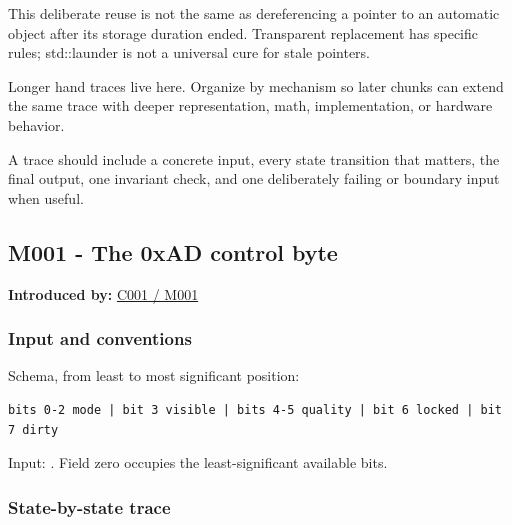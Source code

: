 This deliberate reuse is not the same as dereferencing a pointer to an automatic object after its storage duration ended. Transparent replacement has specific rules; std::launder is not a universal cure for stale pointers.

Longer hand traces live here. Organize by mechanism so later chunks can extend the same trace with deeper representation, math, implementation, or hardware behavior.

A trace should include a concrete input, every state transition that matters, the final output, one invariant check, and one deliberately failing or boundary input when useful.

\subsection{M001 - The 0xAD control byte}\label{appendix-92ff77d4dfdc-m001---the-0xad-control-byte}

\hypertarget{appendix-92ff77d4dfdc-m001---the-0xad-control-byte}{}

\textbf{Introduced by:} \hyperref[01-foundations-i-ch001-from-a-signal-to-an-interpretation]{C001 / M001}

\subsubsection{Input and conventions}\label{appendix-92ff77d4dfdc-input-and-conventions}

\hypertarget{appendix-92ff77d4dfdc-input-and-conventions}{}

Schema, from least to most significant position:

\begin{verbatim}
bits 0-2 mode | bit 3 visible | bits 4-5 quality | bit 6 locked | bit 7 dirty
\end{verbatim}

Input: . Field zero occupies the least-significant available bits.

\subsubsection{State-by-state trace}\label{appendix-92ff77d4dfdc-state-by-state-trace}

\hypertarget{appendix-92ff77d4dfdc-state-by-state-trace}{}

